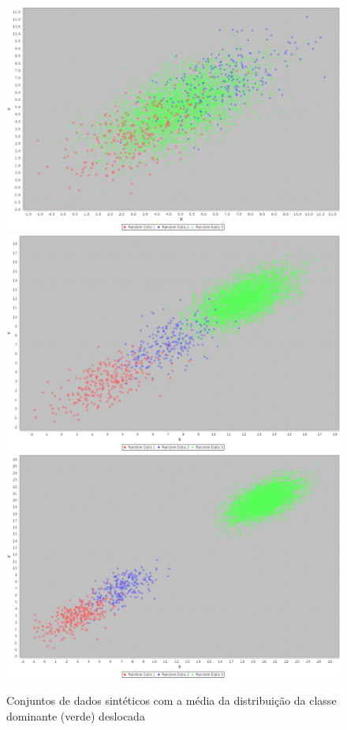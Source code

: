 {\begin{figure}
  \centering
  \includegraphics[width=120mm,scale=0.7]{images/dist250-4000-5.eps}
  \includegraphics[width=120mm,scale=0.7]{images/dist250-4000-12.eps}
  \includegraphics[width=120mm,scale=0.7]{images/dist250-4000-20.eps}
  \caption{Conjuntos de dados sintéticos com a média da distribuição da classe dominante (verde) deslocada}
  \label{fig:dist_iguais}
\end{figure}

}
